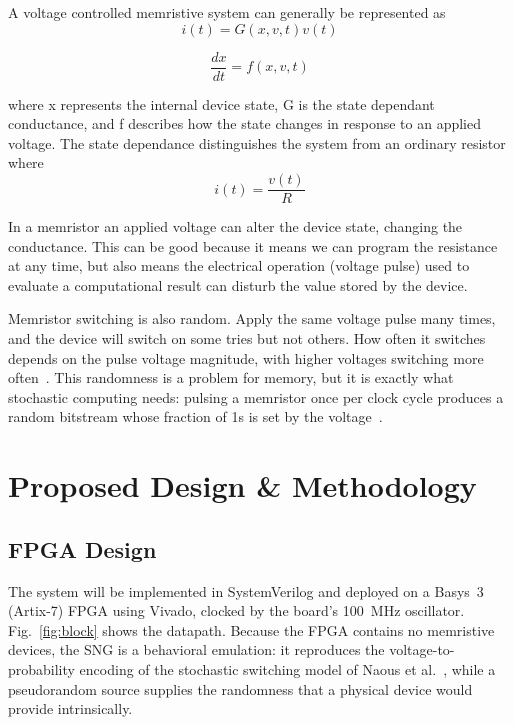 \documentclass[conference]{IEEEtran}
\begin{document}
A voltage controlled memristive system can generally be represented as
\begin{equation}
    i(t) = G(x,v,t)v(t)
\end{equation}

\begin{equation}
    \frac{dx}{dt} = f(x,v,t)
\end{equation}

where x represents the internal device state, G is the state dependant conductance, 
and f describes how the state changes in response to an applied voltage. 
The state dependance distinguishes the system from an ordinary resistor where
\begin{equation}
    i(t)=\frac{v(t)}{R}
\end{equation}

In a memristor an applied voltage can alter the device state, changing the conductance. 
This can be good because it means we can program the resistance at any time, 
but also means the electrical operation (voltage pulse) used to evaluate a 
computational result can disturb the value stored by the device.

Memristor switching is also random. Apply the same voltage pulse many times,
and the device will switch on some tries but not others. How often it
switches depends on the pulse voltage magnitude, with higher voltages switching more
often~\cite{memristor_stochasticity}. This randomness is a problem for
memory, but it is exactly what stochastic computing needs: pulsing a
memristor once per clock cycle produces a random bitstream whose fraction of
1s is set by the voltage~\cite{gaba2013stochastic}.

\section{Proposed Design \& Methodology}

\subsection{FPGA Design}
The system will be implemented in SystemVerilog and deployed on a Basys~3
(Artix-7) FPGA using Vivado, clocked by the board's 100~MHz oscillator.
Fig.~\ref{fig:block} shows the datapath. Because the FPGA contains no
memristive devices, the SNG is a behavioral emulation: it reproduces the
voltage-to-probability encoding of the stochastic switching model of Naous
et al.~\cite{memristor_stochasticity}, while a pseudorandom source supplies
the randomness that a physical device would provide intrinsically.
\end{document}
